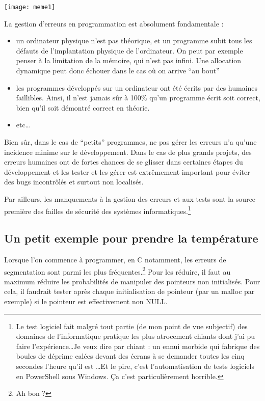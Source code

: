 \documentclass[../../../main.tex]{subfiles}
\begin{document}
\begin{minipage}{\textwidth}
	\begin{center}
		\texttt{[image: meme1]}
	\end{center}
\end{minipage}

La gestion d'erreurs en programmation est absolument fondamentale :
\begin{itemize}
	\item un ordinateur physique n'est pas théorique, et un programme subit tous les défauts de l'implantation physique de l'ordinateur. On peut par exemple penser à la limitation de la mémoire, qui n'est pas infini. Une allocation dynamique peut donc échouer dans le cas où on arrive ``au bout''
	\item les programmes développés sur un ordinateur ont été écrits par des humaines faillibles. Ainsi, il n'est jamais sûr à 100\% qu'un programme écrit soit correct, bien qu'il soit démontré correct en théorie.
	\item etc\dots
\end{itemize}
Bien sûr, dans le cas de ``petits'' programmes, ne pas gérer les erreurs n'a qu'une incidence minime sur le développement. Dans le cas de plus grands projets, des erreurs humaines ont de fortes chances de se glisser dans certaines étapes du développement et les tester et les gérer est extrêmement important pour éviter des bugs incontrôlés et surtout non localisés.

Par ailleurs, les manquements à la gestion des erreurs et aux tests sont la source première des failles de sécurité des systèmes informatiques.\footnote{Le test logiciel fait malgré tout partie (de mon point de vue subjectif) des domaines de l'informatique pratique les plus atrocement chiants dont j'ai pu faire l'expérience\dots Je veux dire par chiant : un ennui morbide qui fabrique des boules de déprime calées devant des écrans à se demander toutes les cinq secondes l'heure qu'il est \dots Et le pire, c'est l'automatisation de tests logiciels en PowerShell sous Windows. Ça c'est particulièrement horrible.}
\subsection{Un petit exemple pour prendre la température}
Lorsque l'on commence à programmer, en C notamment, les erreurs de segmentation sont parmi les plus fréquentes.\footnote{Ah bon ?} Pour les réduire, il faut au maximum réduire les probabilités de manipuler des
pointeurs non initialisés. Pour cela, il faudrait tester après chaque initialisation de pointeur (par un malloc par exemple) si le pointeur est effectivement non \textsf{NULL}.
\end{document}
